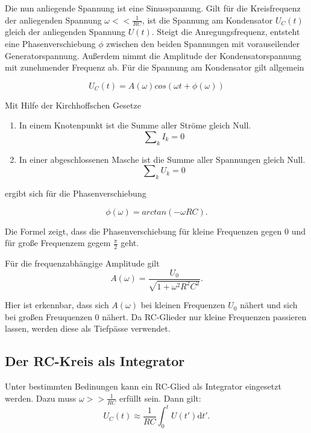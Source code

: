 Die nun anliegende Spannung ist eine Sinusspannung. Gilt für die Kreisfrequenz der anliegenden Spannung $\omega << \frac{1}{RC}$, ist die Spannung am Kondensator $U_C(t)$ gleich der anliegenden Spannung $U(t)$.
Steigt die Anregungsfrequenz, entsteht eine Phasenverschiebung $\phi$ zwischen den beiden Spannungen mit vorauseilender Generatorspannung. Außerdem nimmt die Amplitude der Kondensatorspannung mit zunehmender Frequenz ab. Für die Spannung am Kondensator gilt allgemein

\begin{equation}
  U_C(t) = A(\omega) cos (\omega t + \phi(\omega))
\end{equation}

Mit Hilfe der Kirchhoffschen Gesetze
\begin{enumerate}
  \item In einem Knotenpunkt ist die Summe aller Ströme gleich Null.
  \begin{equation}
    \mathrm\sum_{k} I_k = 0
  \end{equation}
  \item In einer abgeschlossenen Masche ist die Summe aller Spannungen gleich Null.
  \begin{equation}
    \mathrm\sum_{k} U_k = 0
  \end{equation}
\end{enumerate}

ergibt sich für die Phasenverschiebung

\begin{equation}
  \phi(\omega) = arctan(-\omega RC).
\end{equation}

Die Formel zeigt, dass die Phasenverschiebung für kleine Frequenzen gegen 0 und für große Frequenzem gegem $\frac{\pi}{2}$ geht.

Für die frequenzabhängige Amplitude gilt
\begin{equation}
  A(\omega) = \frac{U_0}{\sqrt{1 + \omega^2R^2C^2}}.
\end{equation}

Hier ist erkennbar, dass sich $A(\omega)$ bei kleinen Frequenzen $U_0$ nähert und sich bei großen Freuquenzen 0 nähert. Da RC-Glieder nur kleine Frequenzen passieren lassen, werden diese als Tiefpässe verwendet.

\subsection{Der RC-Kreis als Integrator}
Unter bestimmten Bedinungen kann ein RC-Glied als Integrator eingesetzt werden. Dazu muss $\omega >> \frac{1}{RC}$ erfüllt sein.
Dann gilt:
\begin{equation}
  U_C(t) \approx \frac{1}{RC} \int_0^t U(t') \mathrm{d}t'.
\end{equation}
